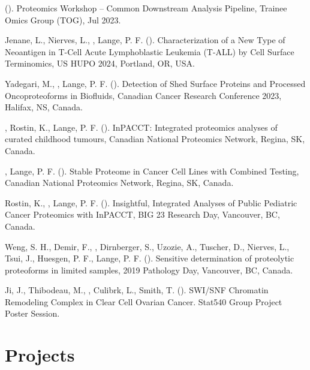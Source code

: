 \documentclass[line]{resonancecv}
\begin{document}
\begin{resume}
\begin{publist}
\item {} (). Proteomics Workshop -- Common Downstream Analysis Pipeline, Trainee Omics Group (TOG), Jul 2023.
\end{publist}

\begin{publist}
\item Jenane, L., Nierves, L., , Lange, P. F. (). Characterization of a New Type of Neoantigen in T-Cell Acute Lymphoblastic Leukemia (T-ALL) by Cell Surface Terminomics, US HUPO 2024, Portland, OR, USA.
\item Yadegari, M., , Lange, P. F. (). Detection of Shed Surface Proteins and Processed Oncoproteoforms in Biofluids, Canadian Cancer Research Conference 2023, Halifax, NS, Canada.
\item {}, Rostin, K., Lange, P. F. (). InPACCT: Integrated proteomics analyses of curated childhood tumours, Canadian National Proteomics Network, Regina, SK, Canada.
\item {}, Lange, P. F. (). Stable Proteome in Cancer Cell Lines with Combined Testing, Canadian National Proteomics Network, Regina, SK, Canada.
\item Rostin, K., , Lange, P. F. (). Insightful, Integrated Analyses of Public Pediatric Cancer Proteomics with InPACCT, BIG 23 Research Day, Vancouver, BC, Canada.
\item Weng, S. H., Demir, F., , Dirnberger, S., Uzozie, A., Tuscher, D., Nierves, L., Tsui, J., Huesgen, P. F., Lange, P. F. (). Sensitive determination of proteolytic proteoforms in limited samples, 2019 Pathology Day, Vancouver, BC, Canada.
\item Ji, J., Thibodeau, M., , Culibrk, L., Smith, T. (). SWI/SNF Chromatin Remodeling Complex in Clear Cell Ovarian Cancer. Stat540 Group Project Poster Session.
\end{publist}

\section{Projects}


\end{resume}
\end{document}
